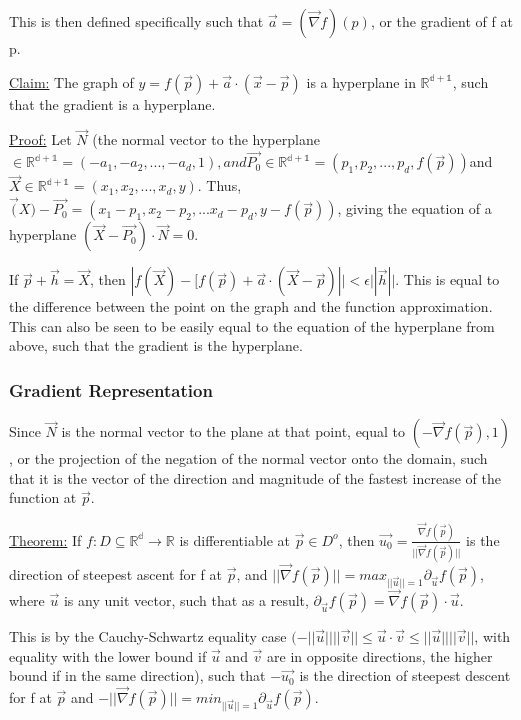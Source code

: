 \documentclass[11 pt, twoside]{article}
\begin{document}
This is then defined specifically such that $\vec{a} = (\vec{\nabla}f)(p)$, or the gradient of f at p.

\underline{Claim:}
The graph of $y = f(\vec{p}) + \vec{a} \cdot (\vec{x} - \vec{p})$ is a hyperplane in $\mathbb{R^{d+1}}$, such that the gradient is a hyperplane.

\underline{Proof:}
Let $\vec{N}$ (the normal vector to the hyperplane$ \in \mathbb{R^{d+1}} = (-a_1, -a_2, ..., -a_d, 1), and \vec{P_0} \in \mathbb{R^{d+1}} = (p_1, p_2, ..., p_d, f(\vec{p}))$and $\vec{X} \in \mathbb{R^{d+1}} = (x_1, x_2, ..., x_d, y)$. Thus, $\vec(X) - \vec{P_0} = (x_1 - p_1, x_2 - p_2, ... x_d - p_d, y - f(\vec{p}))$, giving the equation of a hyperplane $(\vec{X} - \vec{P_0}) \cdot \vec{N} = 0$.

If $\vec{p} + \vec{h} = \vec{X}$, then $|f(\vec{X}) - [f(\vec{p}) + \vec{a} \cdot (\vec{X} - \vec{p})|| < \epsilon||\vec{h}||$. This is equal to the difference between the point on the graph and the function approximation. This can also be seen to be easily equal to the equation of the hyperplane from above, such that the gradient is the hyperplane.

\subsubsection{Gradient Representation}

Since $\vec{N}$ is the normal vector to the plane at that point, equal to $(-\vec{\nabla}f(\vec{p}), 1)$, or the projection of the negation of the normal vector onto the domain, such that it is the vector of the direction and magnitude of the fastest increase of the function at $\vec{p}$.

\underline{Theorem:}
If $f:D \subseteq \mathbb{R^d} \to \mathbb{R}$ is differentiable at $\vec{p} \in D^o$, then $\vec{u_0} = \frac{\vec{\nabla}f(\vec{p})}{||\vec{\nabla}f(\vec{p})||}$ is the direction of steepest ascent for f at $\vec{p}$, and $||\vec{\nabla}f(\vec{p})|| = max_{||\vec{u}||=1} \partial_\vec{u} f(\vec{p})$, where $\vec{u}$ is any unit vector, such that as a result, $\partial_{\vec{u}} f(\vec{p}) = \vec{\nabla}f(\vec{p}) \cdot \vec{u}$.

This is by the Cauchy-Schwartz equality case $(-||\vec{u}||||\vec{v}|| \leq \vec{u} \cdot \vec{v} \leq ||\vec{u}||||\vec{v}||$, with equality with the lower bound if $\vec{u}$ and $\vec{v}$ are in opposite directions, the higher bound if in the same direction), such that $-\vec{u_0}$ is the direction of steepest descent for f at $\vec{p}$ and $-||\vec{\nabla}f(\vec{p})|| = min_{||\vec{u}||=1} \partial_{\vec{u}}f(\vec{p}).$ 
\end{document}
